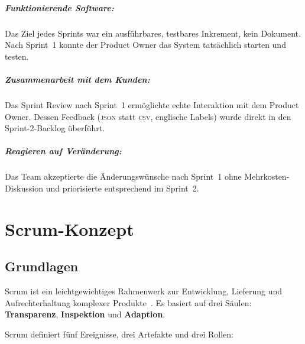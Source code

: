 \documentclass[12pt, a4paper, twoside]{report}
\newcommand{\json}{\textsc{json}}
\begin{document}
\paragraph{Funktionierende Software:}
Das Ziel jedes Sprints war ein ausführbares, testbares Inkrement, kein Dokument. Nach Sprint~1
konnte der Product Owner das System tatsächlich starten und testen.

\paragraph{Zusammenarbeit mit dem Kunden:}
Das Sprint Review nach Sprint~1 ermöglichte echte Interaktion mit dem Product Owner.
Dessen Feedback (\json{} statt \textsc{csv}, englische Labels) wurde direkt in den
Sprint-2-Backlog überführt.

\paragraph{Reagieren auf Veränderung:}
Das Team akzeptierte die Änderungswünsche nach Sprint~1 ohne Mehrkosten-Diskussion und
priorisierte entsprechend im Sprint~2.

\chapter{Scrum-Konzept}
\label{chap:scrum}

\section{Grundlagen}

Scrum ist ein leichtgewichtiges Rahmenwerk zur Entwicklung, Lieferung und Aufrechterhaltung
komplexer Produkte~\autocite{schwaber2020}. Es basiert auf drei Säulen:
\textbf{Transparenz}, \textbf{Inspektion} und \textbf{Adaption}.

Scrum definiert fünf Ereignisse, drei Artefakte und drei Rollen:
\end{document}
